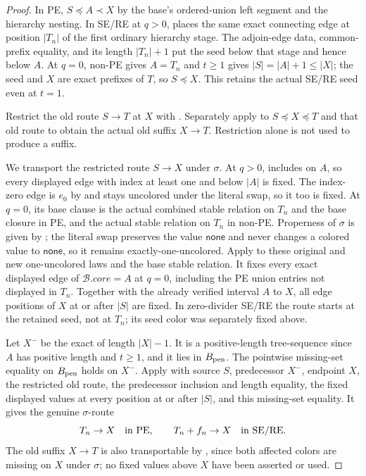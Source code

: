 \begin{proof}
In PE, $S\preccurlyeq A\prec X$ by the base's ordered-union
left segment and the hierarchy nesting. In SE/RE at $q>0$,
 places the same exact connecting
edge at position $|T_n|$ of the first ordinary hierarchy stage.
The adjoin-edge data, common-prefix equality, and its length
$|T_n|+1$ put the seed below that stage and hence below $A$.
At $q=0$, non-PE gives $A=T_n$ and $t\ge1$ gives
$|S|=|A|+1\le|X|$; the seed and $X$ are exact prefixes of $T$, so
$S\preccurlyeq X$. This retains the actual SE/RE seed even at $t=1$.

Restrict the old route $S\to T$ at $X$ with
. Separately apply
 to
$S\preccurlyeq X\preccurlyeq T$ and that old route to obtain the actual
old suffix $X\to T$. Restriction alone is not used to produce a suffix.

We transport the restricted route $S\to X$ under $\sigma$.
At $q>0$,  includes
 on $A$, so every displayed edge with
index at least one and below $|A|$ is fixed. The index-zero edge is
$e_0$ by  and stays uncolored under the literal
swap, so it too is fixed. At $q=0$, its base clause is the actual combined
stable relation on $T_n$ and the base closure in PE, and the actual
stable relation on $T_n$ in non-PE. Properness of $\sigma$ is given by
; the literal swap preserves the
value $\mathsf{none}$ and never changes a colored value to
$\mathsf{none}$, so it remains exactly-one-uncolored.
Apply  to these original and new
one-uncolored laws and the base stable relation. It fixes every exact
displayed edge of $\mathcal B.\mathit{core}=A$ at $q=0$,
including the PE union entries not displayed in $T_n$.
Together with the already verified interval $A$ to $X$, all edge
positions of $X$ at or after $|S|$ are fixed. In zero-divider SE/RE
the route starts at the retained seed, not at $T_n$; its seed color
was separately fixed above.

Let $X^-$ be the exact  of length $|X|-1$.
It is a positive-length tree-sequence since $A$ has positive length
and $t\ge1$, and it lies in $B_{\rm pen}$.
The pointwise missing-set equality on $B_{\rm pen}$ holds on $X^-$.
Apply  with
source $S$, predecessor $X^-$, endpoint $X$, the restricted old route,
the predecessor inclusion and length equality, the fixed displayed
values at every position at or after $|S|$, and this missing-set equality.
It gives the genuine $\sigma$-route
\[
 T_n\to X\quad\hbox{in PE},\qquad
 T_n+f_n\to X\quad\hbox{in SE/RE}.
\]
The old suffix $X\to T$ is also transportable by
, since both
affected colors are missing on $X$ under $\sigma$; no fixed values
above $X$ have been asserted or used.


\end{proof}
